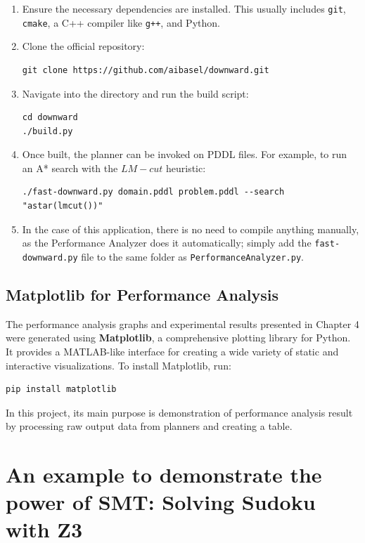 \documentclass[12pt, a4paper, oneside]{report} %
\begin{document}
\begin{enumerate}
    \item Ensure the necessary dependencies are installed. This usually includes \texttt{git}, \texttt{cmake}, a C++ compiler like \texttt{g++}, and Python.
    \item Clone the official repository:
    \begin{verbatim}
git clone https://github.com/aibasel/downward.git
    \end{verbatim}
    \item Navigate into the directory and run the build script:
    \begin{verbatim}
cd downward
./build.py
    \end{verbatim}
    \item Once built, the planner can be invoked on PDDL files. For example, to run an A* search with the $LM-cut$ heuristic:
    \begin{verbatim}
./fast-downward.py domain.pddl problem.pddl --search
"astar(lmcut())"
    \end{verbatim}
    \item In the case of this application, there is no need to compile anything manually, as the Performance Analyzer does it automatically; simply add the \texttt{fast-downward.py} file to the same folder as \texttt{PerformanceAnalyzer.py}.
\end{enumerate}

\subsection*{Matplotlib for Performance Analysis}
\label{sec:matplotlib_install}

The performance analysis graphs and experimental results presented in Chapter 4 were generated using \textbf{Matplotlib}, a comprehensive plotting library for Python. It provides a MATLAB-like interface for creating a wide variety of static and interactive visualizations.
To install Matplotlib, run:
\begin{verbatim}
pip install matplotlib
\end{verbatim}

\noindent In this project, its main purpose is demonstration of performance analysis result by processing raw output data from planners and creating a table.
\section{An example to demonstrate the power of SMT: Solving Sudoku with Z3}
\end{document}
